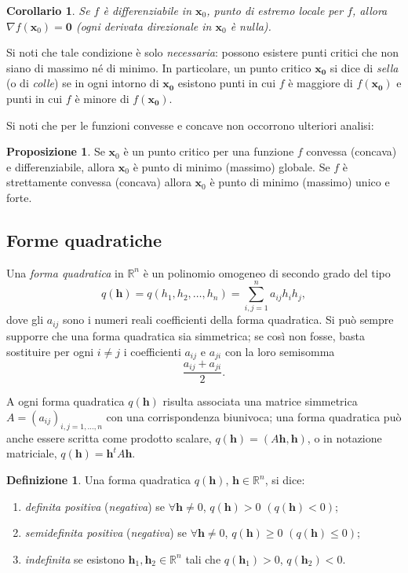 \documentclass[a4paper]{book}
\numberwithin{equation}{section}
\theoremstyle{plain}
\newtheorem{cor}{Corollario}[section]
\theoremstyle{definition}
\newtheorem{defn}{Definizione}[section]
\newtheorem{prop}{Proposizione}[section]
\theoremstyle{remark}
\renewcommand{\vec}{\boldsymbol}
\theoremstyle{example}
\begin{document}
\begin{cor}
Se $f$ è differenziabile in $\vec{x}_0$, punto di estremo locale per $f$, allora $\nabla f(\vec{x}_0) = \vec{0}$ (ogni derivata direzionale in $\vec{x}_0$ è nulla).
\end{cor}

Si noti che tale condizione è solo \emph{necessaria}: possono esistere punti critici che non siano di massimo né di minimo. In particolare, un punto critico $\vec{x_0}$ si dice di \emph{sella} (o di \emph{colle}) se in ogni intorno di $\vec{x_0}$ esistono punti in cui $f$ è maggiore di $f(\vec{x_0})$ e punti in cui $f$ è minore di $f(\vec{x_0})$.

Si noti che per le funzioni convesse e concave non occorrono ulteriori analisi:
\begin{prop}
Se $\vec{x}_0$ è un punto critico per una funzione $f$ convessa (concava) e differenziabile, allora $\vec{x}_0$ è punto di minimo (massimo) globale. Se $f$ è strettamente convessa (concava) allora $\vec{x}_0$ è punto di minimo (massimo) unico e forte.
\end{prop}

\subsection{Forme quadratiche}
\label{subsec:formequadratiche}
Una \emph{forma quadratica} in $\mathbb{R}^n$ è un polinomio omogeneo di secondo grado del tipo
	\begin{equation}
	\label{eqn:formaquadratica}
	q(\vec{h}) = q(h_1, h_2, \dots, h_n) = \sum_{i,j=1}^na_{ij}h_ih_j,
	\end{equation}
dove gli $a_{ij}$ sono i numeri reali coefficienti della forma quadratica. Si può sempre supporre che una forma quadratica sia simmetrica; se così non fosse, basta sostituire per ogni $i \ne j$ i coefficienti $a_{ij}$ e $a_{ji}$ con la loro semisomma
	\begin{equation*}
	\frac{a_{ij} + a_{ji}}{2}.
	\end{equation*}

A ogni forma quadratica $q(\vec{h})$ risulta associata una matrice simmetrica $A = (a_{ij})_{i,j = 1, \dots, n}$ con una corrispondenza biunivoca; una forma quadratica può anche essere scritta come prodotto scalare, $q(\vec{h}) = (A\vec{h}, \vec{h})$, o in notazione matriciale, $q(\vec{h}) = \vec{h}^tA\vec{h}$.

\begin{defn}
Una forma quadratica $q(\vec{h})$, $\vec{h} \in \mathbb{R}^n$, si dice:
	\begin{enumerate}
	\item \emph{definita positiva} (\emph{negativa}) se $\forall \vec{h} \ne 0$, $q(\vec{h}) > 0$ $(q(\vec{h}) < 0)$;
	\item \emph{semidefinita positiva} (\emph{negativa}) se $\forall \vec{h} \ne 0$, $q(\vec{h}) \ge 0$ $(q(\vec{h}) \le 0)$;
	\item \emph{indefinita} se esistono $\vec{h}_1, \vec{h}_2 \in \mathbb{R}^n$ tali che $q(\vec{h}_1) > 0$, $q(\vec{h}_2) < 0$.
	\end{enumerate}
\end{defn}
\end{document}
